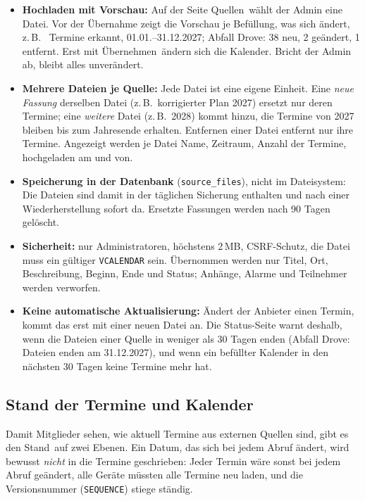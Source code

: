 \documentclass[a4paper,fontsize=10pt]{scrartcl}
\newcommand{\code}[1]{\texttt{#1}}
\begin{document}
\begin{itemize}
  \item \textbf{Hochladen mit Vorschau:} Auf der Seite \glqq Quellen\grqq\
        wählt der Admin eine Datei. Vor der Übernahme zeigt die Vorschau je
        Befüllung, was sich ändert, z.\,B.\ \glqq 42 Termine erkannt,
        01.01.--31.12.2027; Abfall Drove: 38 neu, 2 geändert, 1 entfernt\grqq.
        Erst mit \glqq Übernehmen\grqq\ ändern sich die Kalender. Bricht der
        Admin ab, bleibt alles unverändert.
  \item \textbf{Mehrere Dateien je Quelle:} Jede Datei ist eine eigene
        Einheit. Eine \emph{neue Fassung} derselben Datei (z.\,B.\
        korrigierter Plan 2027) ersetzt nur deren Termine; eine
        \emph{weitere} Datei (z.\,B.\ 2028) kommt hinzu, die Termine von
        2027 bleiben bis zum Jahresende erhalten. Entfernen einer Datei
        entfernt nur ihre Termine. Angezeigt werden je Datei Name, Zeitraum,
        Anzahl der Termine, hochgeladen am und von.
  \item \textbf{Speicherung in der Datenbank} (\code{source\_files}),
        nicht im Dateisystem: Die Dateien sind damit in der täglichen
        Sicherung enthalten und nach einer Wiederherstellung sofort da.
        Ersetzte Fassungen werden nach 90 Tagen gelöscht.
  \item \textbf{Sicherheit:} nur Administratoren, höchstens 2\,MB, CSRF-Schutz,
        die Datei muss ein gültiger \code{VCALENDAR} sein. Übernommen werden
        nur Titel, Ort, Beschreibung, Beginn, Ende und Status; Anhänge,
        Alarme und Teilnehmer werden verworfen.
  \item \textbf{Keine automatische Aktualisierung:} Ändert der Anbieter einen
        Termin, kommt das erst mit einer neuen Datei an. Die Status-Seite
        warnt deshalb, wenn die Dateien einer Quelle in weniger als 30 Tagen
        enden (\glqq Abfall Drove: Dateien enden am 31.12.2027\grqq), und
        wenn ein befüllter Kalender in den nächsten 30 Tagen keine Termine
        mehr hat.
\end{itemize}

\subsection{Stand der Termine und Kalender}\label{sec:quellen-stand}

Damit Mitglieder sehen, wie aktuell Termine aus externen Quellen sind, gibt es
den \glqq Stand\grqq\ auf zwei Ebenen. Ein Datum, das sich bei jedem Abruf
ändert, wird bewusst \emph{nicht} in die Termine geschrieben: Jeder Termin
wäre sonst bei jedem Abruf geändert, alle Geräte müssten alle Termine neu
laden, und die Versionsnummer (\code{SEQUENCE}) stiege ständig.
\end{document}

